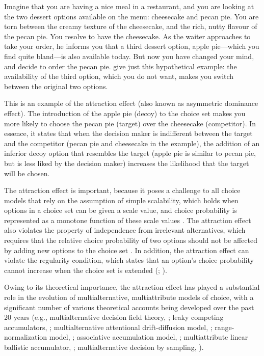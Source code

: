 \documentclass[12pt, a4paper]{article}
\begin{document}
Imagine that you are having a nice meal in a restaurant, and you are looking at the two dessert options available on the menu: cheesecake and pecan pie. You are torn between the creamy texture of the cheesecake, and the rich, nutty flavour of the pecan pie. You resolve to have the cheesecake. As the waiter approaches to take your order, he informs you that a third dessert option, apple pie---which you find quite bland---is also available today. But now you have changed your mind, and decide to order the pecan pie.  give just this hypothetical example: the availability of the third option, which you do not want, makes you switch between the original two options.

This is an example of the attraction effect (also known as asymmetric dominance effect). The introduction of the apple pie (decoy) to the choice set makes you more likely to choose the pecan pie (target) over the cheesecake (competitor). In essence, it states that when the decision maker is indifferent between the target and the competitor (pecan pie and cheesecake in the example), the addition of an inferior decoy option that resembles the target (apple pie is similar to pecan pie, but is less liked by the decision maker) increases the likelihood that the target will be chosen.


The attraction effect is important, because it poses a challenge to all choice models that rely on the assumption of simple scalability, which holds when options in a choice set can be given a scale value, and choice probability is represented as a monotone function of these scale values \cite{Trueblood2013a}. The attraction effect also violates the property of independence from irrelevant alternatives, which requires that the relative choice probability of two options should not be affected by adding new options to the choice set \cite{Pleskac2015}. In addition, the attraction effect can violate the regularity condition, which states that an option's choice probability cannot increase when the choice set is extended (; ). 


Owing to its theoretical importance, the attraction effect has played a substantial role in the evolution of multialternative, multiattribute models of choice, with a significant number of various theoretical accounts being developed over the past 20 years (e.g., multialternative decision field theory, ; leaky competing accumulators, ; multialternative attentional drift-diffusion model,   ; range-normalization model, ; associative accumulation model, ; multiattribute linear ballistic accumulator, ; multialternative decision by sampling, ).
\end{document}
